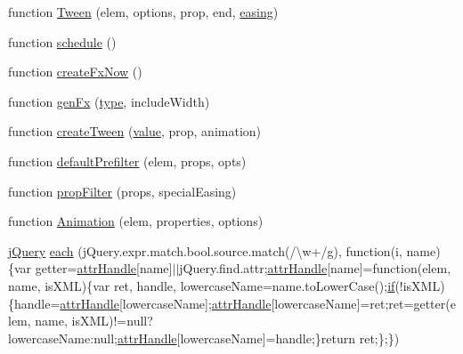 \begin{DoxyCompactItemize}
\item 
function \hyperlink{jquery-3_82_81_8js_adcb517ce3709049d37bb5f5bd3811edf}{Tween} (elem, options, prop, end, \hyperlink{jquery-3_82_81_8js_a9758a312629fa6de1744280dd6e6253b}{easing})
\item 
function \hyperlink{jquery-3_82_81_8js_a0a981fcb37f061b6bc208ee5510f22d2}{schedule} ()
\item 
function \hyperlink{jquery-3_82_81_8js_a3c7bcef859b0811abb1dbf890c6cc635}{create\+Fx\+Now} ()
\item 
function \hyperlink{jquery-3_82_81_8js_a0dad9ae6c57fd32a071de202faa87081}{gen\+Fx} (\hyperlink{jquery-3_82_81_8js_a4c4533b7d49de290bb8cccd4e6f43349}{type}, include\+Width)
\item 
function \hyperlink{jquery-3_82_81_8js_a0c2043fcd2fa684768877127fbbc2e55}{create\+Tween} (\hyperlink{jquery-3_82_81_8js_a9d32b6baf31ab8047d93bf7e388971b9}{value}, prop, animation)
\item 
function \hyperlink{jquery-3_82_81_8js_a8041b1040535dcee84ad474aaaf11dde}{default\+Prefilter} (elem, props, opts)
\item 
function \hyperlink{jquery-3_82_81_8js_a0196d1f08ae60b747901b5a2950f72f1}{prop\+Filter} (props, special\+Easing)
\item 
function \hyperlink{jquery-3_82_81_8js_aa33f7dcb8ee41587d545a0bc69849296}{Animation} (elem, properties, options)
\item 
\hyperlink{jquery-3_82_81_8js_a609525712f1102566c2b03866ceb2bba}{j\+Query} \hyperlink{jquery-3_82_81_8js_a5e32fa27ad47d637fb3c84ec6ce78e69}{each} (j\+Query.\+expr.\+match.\+bool.\+source.\+match(/\textbackslash{}w+/g), function(i, name)\{var getter=\hyperlink{jquery-3_82_81_8js_abedf49e04e7bca6a84f4d9f695ab0508}{attr\+Handle}\mbox{[}name\mbox{]}$\vert$$\vert$j\+Query.\+find.\+attr;\hyperlink{jquery-3_82_81_8js_abedf49e04e7bca6a84f4d9f695ab0508}{attr\+Handle}\mbox{[}name\mbox{]}=function(elem, name, is\+X\+ML)\{var ret, handle, lowercase\+Name=name.\+to\+Lower\+Case();\hyperlink{jquery-3_82_81_8js_ad6cbdd9e1fadb4d9540fff933cdd6fdc}{if}(!is\+X\+ML)\{handle=\hyperlink{jquery-3_82_81_8js_abedf49e04e7bca6a84f4d9f695ab0508}{attr\+Handle}\mbox{[}lowercase\+Name\mbox{]};\hyperlink{jquery-3_82_81_8js_abedf49e04e7bca6a84f4d9f695ab0508}{attr\+Handle}\mbox{[}lowercase\+Name\mbox{]}=ret;ret=getter(elem, name, is\+X\+ML)!=null?lowercase\+Name\+:null;\hyperlink{jquery-3_82_81_8js_abedf49e04e7bca6a84f4d9f695ab0508}{attr\+Handle}\mbox{[}lowercase\+Name\mbox{]}=handle;\}return ret;\};\})
\item 
$$
\end{DoxyCompactItemize}
